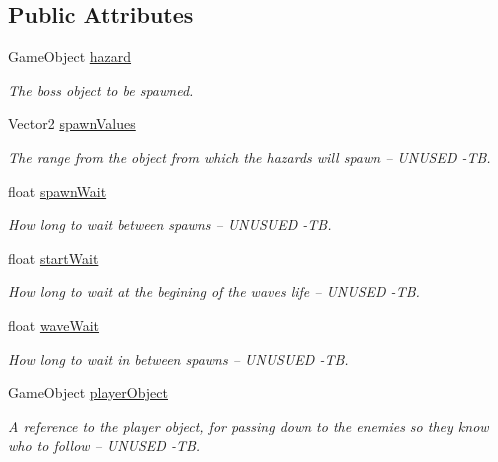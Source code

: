 \subsection*{Public Attributes}
\begin{DoxyCompactItemize}
\item 
Game\+Object \mbox{\hyperlink{class_boss_spawn_a5fde10547d9cd6309ee29a636a042081}{hazard}}
\begin{DoxyCompactList}\small\item\em The boss object to be spawned. \end{DoxyCompactList}\item 
Vector2 \mbox{\hyperlink{class_boss_spawn_a86c641a6ea5754b9160ae4c0a0a8668d}{spawn\+Values}}
\begin{DoxyCompactList}\small\item\em The range from the object from which the hazards will spawn -- U\+N\+U\+S\+ED -\/TB. \end{DoxyCompactList}\item 
float \mbox{\hyperlink{class_boss_spawn_aa09381d8f6025a408b13c7df16568ff0}{spawn\+Wait}}
\begin{DoxyCompactList}\small\item\em How long to wait between spawns -- U\+N\+U\+S\+U\+ED -\/TB. \end{DoxyCompactList}\item 
float \mbox{\hyperlink{class_boss_spawn_a96261ab1bd409caeb45cd8d59426b518}{start\+Wait}}
\begin{DoxyCompactList}\small\item\em How long to wait at the begining of the wave\textquotesingle{}s life -- U\+N\+U\+S\+ED -\/TB. \end{DoxyCompactList}\item 
float \mbox{\hyperlink{class_boss_spawn_a8a35320ba7ac1e86bf1c913647f8b09c}{wave\+Wait}}
\begin{DoxyCompactList}\small\item\em How long to wait in between spawns -- U\+N\+U\+S\+U\+ED -\/TB. \end{DoxyCompactList}\item 
Game\+Object \mbox{\hyperlink{class_boss_spawn_acf908e160b37dbbae76a3bf8ee3ed6d4}{player\+Object}}
\begin{DoxyCompactList}\small\item\em A reference to the player object, for passing down to the enemies so they know who to follow -- U\+N\+U\+S\+ED -\/TB. \end{DoxyCompactList}\end{DoxyCompactItemize}


